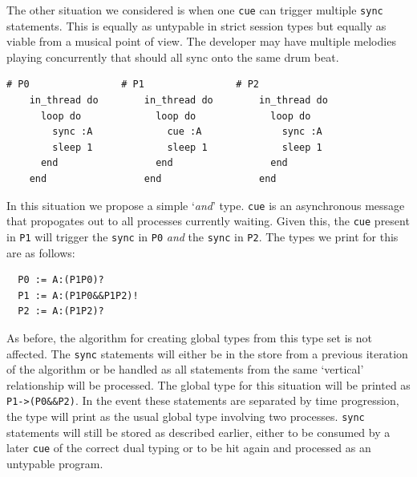 \documentclass[11pt, abstracton, twoside]{scrartcl}
\begin{document}
The other situation we considered is when one \texttt{cue} can trigger
multiple \texttt{sync} statements. This is equally as untypable in strict
session types but equally as viable from a musical point of view. The developer
may have multiple melodies playing concurrently that should all sync onto the
same drum beat.

\begin{minipage}{\textwidth}
	\begin{lstlisting}[style = sonicpi]
    # P0                # P1                # P2
    in_thread do        in_thread do        in_thread do
      loop do             loop do             loop do
        sync :A             cue :A              sync :A
        sleep 1             sleep 1             sleep 1
      end                 end                 end
    end                 end                 end
	\end{lstlisting}
\end{minipage}

In this situation we propose a simple `\emph{and}' type. \texttt{cue} is an
asynchronous message that propogates out to all processes currently waiting.
Given this, the \texttt{cue} present in \texttt{P1} will trigger the \texttt{sync}
in \texttt{P0} \emph{and} the \texttt{sync} in \texttt{P2}. The types we 
print for this are as follows:
\\
\begin{lstlisting}
  P0 := A:(P1P0)?
  P1 := A:(P1P0&&P1P2)!
  P2 := A:(P1P2)?
\end{lstlisting}

As before, the algorithm for creating global types from this type set is not
affected. The \texttt{sync} statements will either be in the store from a previous
iteration of the algorithm or be handled as all statements from the same `vertical'
relationship will be processed. The global type for this situation will be printed
as \texttt{P1->(P0\&\&P2)}. In the event these statements are separated by time
progression, the type will print as the usual global type involving two processes.
\texttt{sync} statements will still be stored as described earlier, either to be
consumed by a later \texttt{cue} of the correct dual typing or to be hit again
and processed as an untypable program.
\end{document}
